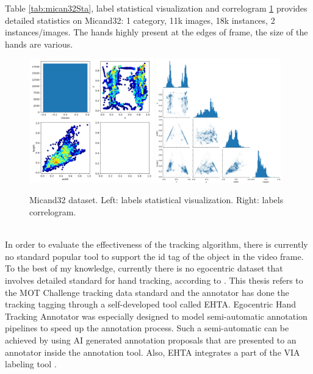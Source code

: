 Table \ref{tab:mican32Sta}, label statistical visualization and correlogram \ref{fig:micand32_visualization} provides detailed statistics on Micand32: 1 category, 11k images, 18k instances, 2 instances/images. The hands highly present at the edges of frame, the size of the hands are various. 
\begin{figure}[ht!]
	\centering
	\includegraphics[width=0.48\textwidth]{Figs/yolov5/labels.png}
	\includegraphics[width=0.48\textwidth]{Figs/yolov5/labels_correlogram.png}
	\caption{Micand32 dataset. Left: labels statistical visualization. Right: labels correlogram.}
	\label{fig:micand32_visualization}
\end{figure}
\\In order to evaluate the effectiveness of the tracking algorithm, there is currently no standard popular tool to support the id tag of the object in the video frame. To the best of my knowledge, currently there is no egocentric dataset that involves detailed standard for hand tracking, according to \cite{9064606}. This thesis refers to the MOT Challenge tracking data standard and the annotator has done the tracking tagging through a self-developed tool called EHTA. Egocentric Hand Tracking Annotator was especially designed to model semi-automatic annotation pipelines to speed up the annotation process. Such a semi-automatic can be achieved by using AI generated annotation proposals that are presented to an annotator inside the annotation tool. Also, EHTA integrates a part of the VIA labeling tool \cite{10.1145/3343031.3350535}.
